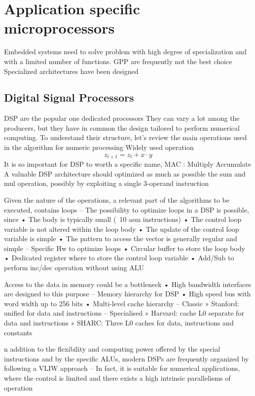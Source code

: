 \section{Application specific microprocessors}

Embedded systems need to solve problem with high degree of specialization and with a limited number of functions.
GPP are frequently not the best choice
Specialized architectures have been designed

\subsection{Digital Signal Processors}
DSP are the popular one dedicated processors
They can vary a lot among the producers, but they have in common the design tailored to perform numerical computing. 
To understand their structure, let's review the main operations used in the algorithm for numeric processing
Widely used operation
\[z_{t+1} = z_t + x \cdot y\]
It is so important for DSP to worth a specific name, MAC : Multiply Accumulate
A valuable DSP architecture should optimized as much as possible the sum and mul operation, possibly by exploiting a single 3-operand instruction

Given the nature of the operations, a relevant part of the
algorithms to be executed, contains loops
– The possibility to optimize loops in a DSP is possible, since
• The body is typically small (~10 asm instructions)
• The control loop variable is not altered within the loop body
• The update of the control loop variable is simple
• The pattern to access the vector is generally regular and simple
– Specific Hw to optimize loops
• Circular buffer to store the loop body
• Dedicated register where to store the control loop variable
• Add/Sub to perform inc/dec operation without using ALU

Access to the data in memory could be a bottleneck
• High bandwidth interfaces are designed to this purpose
– Memory hierarchy for DSP
• High speed bus with word width up to 256 bits
• Multi-level cache hierarchy
– Classic
» Stanford: unified for data and instructions
– Specialised
» Harvard: cache L0 separate for data and instructions
» SHARC: Three L0 caches for data, instructions and constants

n addition to the flexibility and computing power offered by the
special instructions and by the specific ALUs, modern DSPs are
frequently organized by following a VLIW approach
– In fact, it is suitable for numerical applications, where the control
is limited and there exists a high intrinsic parallelisms of
operation

